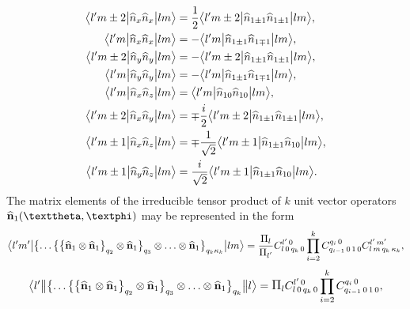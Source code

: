 \begin{align}
\bigl\langle  l^{\prime} m \pm 2 \big|  \widehat{n}_{x} \widehat{n}_{x} \big| l m \bigr\rangle & =\frac{1}{2}
\bigl\langle  l^{\prime} m \pm 2 \big|  \widehat{n}_{1 \pm 1} \widehat{n}_{1 \pm 1} \big| l m \bigr\rangle, \notag\\
\bigl\langle  l^{\prime} m \big|  \widehat{n}_{x} \widehat{n}_{x} \big| l m \bigr\rangle & =-
\bigl\langle  l^{\prime} m \big|  \widehat{n}_{1 \pm 1} \widehat{n}_{1 \mp 1} \big| l m \bigr\rangle, \notag\\
\bigl\langle  l^{\prime} m \pm 2 \big|  \widehat{n}_{y} \widehat{n}_{y} \big| l m \bigr\rangle & =-
\bigl\langle  l^{\prime} m \pm 2 \big|  \widehat{n}_{1 \pm 1} \widehat{n}_{1 \pm 1} \big| l m \bigr\rangle, \notag\\
\bigl\langle  l^{\prime} m \big|  \widehat{n}_{y} \widehat{n}_{y} \big| l m \bigr\rangle & =-
\bigl\langle  l^{\prime} m \big|  \widehat{n}_{1 \pm 1} \widehat{n}_{1 \mp 1} \big| l m \bigr\rangle, \notag \\
\bigl\langle  l^{\prime} m \big|  \widehat{n}_{x} \widehat{n}_{z} \big| l m \bigr\rangle & =
\bigl\langle  l^{\prime} m \big|  \widehat{n}_{10} \widehat{n}_{10} \big| l m \bigr\rangle,  \label{eq:13:2:18}\\
\bigl\langle  l^{\prime} m \pm 2 \big|  \widehat{n}_{x} \widehat{n}_{y} \big| l m \bigr\rangle & =\mp \frac{i}{2}
\bigl\langle  l^{\prime} m \pm 2 \big|  \widehat{n}_{1 \pm 1} \widehat{n}_{1 \pm 1} \big| l m \bigr\rangle, \notag\\
\bigl\langle  l^{\prime} m \pm 1 \big|  \widehat{n}_{x} \widehat{n}_{z} \big| l m \bigr\rangle & =\mp \frac{1}{\sqrt{2}}
\bigl\langle  l^{\prime} m \pm 1 \big|  \widehat{n}_{1 \pm 1} \widehat{n}_{10} \big| l m \bigr\rangle, \notag\\
\bigl\langle  l^{\prime} m \pm 1 \big|  \widehat{n}_{y} \widehat{n}_{z} \big| l m \bigr\rangle & =\frac{i}{\sqrt{2}}
\bigl\langle  l^{\prime} m \pm 1 \big|  \widehat{n}_{1 \pm 1} \widehat{n}_{10} \big| l m \bigr\rangle. \notag
\end{align}
The matrix elements of the irreducible tensor product of \(k\) unit vector operators \(\widehat{\vect{n}}_{1}(\vartheta, \varphi)\) may be represented in the form
\begin{equation}
\braOket{ l^{\prime} m^{\prime}}{\bigl\{\ldots\bigl\{\bigl\{\widehat{\vect{n}}_{1} \otimes \widehat{\vect{n}}_{1}\bigr\}_{q_{2}} \otimes \widehat{\vect{n}}_{1}\bigr\}_{q_{3}} \otimes \ldots \otimes \widehat{\vect{n}}_{1}\bigr\}_{q_{k} \kappa_{k}}}{l m}=\frac{\Fact{l}}{\Fact{l^{\prime}}} 
\clebsch{l}{0}{q_{k}}{0}{l^{\prime}}{0} \prod_{i=2}^{k} 
\clebsch{q_{i-1}}{0}{1}{0}{q_{i}}{0} 
\clebsch{l}{m}{q_{k}}{\kappa_{k}}{l^{\prime}}{m^{\prime}}, \label{eq:13:2:19}
\end{equation}
\begin{equation*}
\braOketred{ l^{\prime}}{\bigl\{\ldots\bigl\{\bigl\{\widehat{\vect{n}}_{1} \otimes \widehat{\vect{n}}_{1}\bigr\}_{q_{2}} \otimes \widehat{\vect{n}}_{1}\bigr\}_{q_{3}} \otimes \ldots \otimes \widehat{\vect{n}}_{1}\bigr\}_{q_{k}}}{ l}=\Fact{l}
\clebsch{l}{0}{q_{k}}{0}{l^{\prime}}{0} \prod_{i=2}^{k}
\clebsch{q_{i-1}}{0}{1}{0}{q_{i}}{0},
\end{equation*}
